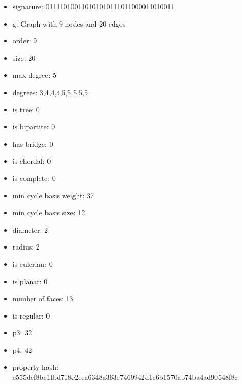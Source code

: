 \newpage
\begin{figure}
\end{figure}
\begin{itemize}
\item signature: 011110100110101010111011000011010011
\item g: Graph with 9 nodes and 20 edges
\item order: 9
\item size: 20
\item max degree: 5
\item degrees: 3,4,4,4,5,5,5,5,5
\item is tree: 0
\item is bipartite: 0
\item has bridge: 0
\item is chordal: 0
\item is complete: 0
\item min cycle basis weight: 37
\item min cycle basis size: 12
\item diameter: 2
\item radius: 2
\item is eulerian: 0
\item is planar: 0
\item number of faces: 13
\item is regular: 0
\item p3: 32
\item p4: 42
\item property hash: e555dcf8bc1fbd718c2eea6348a363e7469942d1c6b1570ab74ba4ad90548f8c
\end{itemize}
